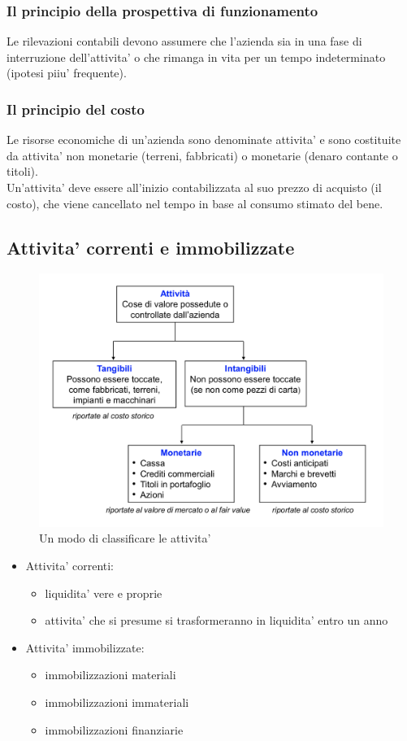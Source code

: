 \documentclass{report}
\begin{document}
	\subsubsection{Il principio della prospettiva di funzionamento}
	Le rilevazioni contabili devono assumere che l'azienda sia in una fase di interruzione dell'attivita' o che rimanga in vita per un tempo indeterminato (ipotesi piiu' frequente).
	\subsubsection{Il principio del costo}
	Le risorse economiche di un'azienda sono denominate attivita' e sono costituite da attivita' non monetarie (terreni, fabbricati) o monetarie (denaro contante o titoli).
	\medskip \\Un'attivita' deve essere all'inizio contabilizzata al suo prezzo di acquisto (il costo), che viene cancellato nel tempo in base al consumo stimato del bene.
	\subsection{Attivita' correnti e immobilizzate}
	\begin{figure}[h]
		\centering
		\caption{Un modo di classificare le attivita'}
		\label{fig:classificazione-attivita}
		\includegraphics[width=0.7\linewidth]{classificazione-attivita}
	\end{figure}
	\begin{itemize}
		\item Attivita' correnti:
		\begin{itemize}
			\item liquidita' vere e proprie
			\item attivita' che si presume si trasformeranno in liquidita' entro un anno \\
		\end{itemize}
		\item Attivita' immobilizzate:
		\begin{itemize}
			\item immobilizzazioni materiali
			\item immobilizzazioni immateriali
			\item immobilizzazioni finanziarie
		\end{itemize}
	\end{itemize}
\end{document}
